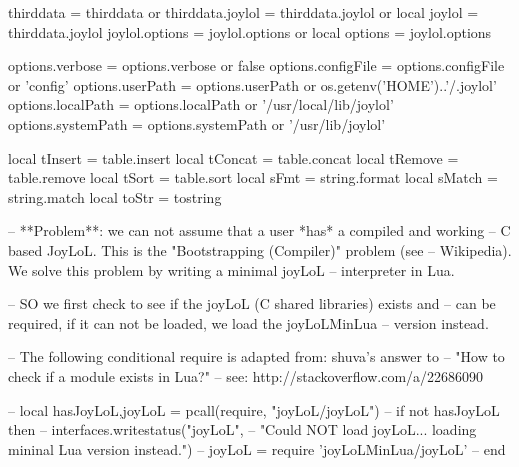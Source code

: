 thirddata          = thirddata        or {}
thirddata.joylol   = thirddata.joylol or {}
local joylol       = thirddata.joylol
joylol.options     = joylol.options or {}
local options      = joylol.options

options.verbose    =
  options.verbose    or false
options.configFile =
  options.configFile or 'config'
options.userPath   =
  options.userPath   or os.getenv('HOME')..'/.joylol'
options.localPath  =
  options.localPath  or '/usr/local/lib/joylol'
options.systemPath =
  options.systemPath or '/usr/lib/joylol'

local tInsert = table.insert
local tConcat = table.concat
local tRemove = table.remove
local tSort   = table.sort
local sFmt    = string.format
local sMatch  = string.match
local toStr   = tostring

-- **Problem**: we can not assume that a user *has* a compiled and working 
-- C based JoyLoL. This is the "Bootstrapping (Compiler)" problem (see 
-- Wikipedia). We solve this problem by writing a minimal joyLoL 
-- interpreter in Lua. 

-- SO we first check to see if the joyLoL (C shared libraries) exists and 
-- can be required, if it can not be loaded, we load the joyLoLMinLua 
-- version instead. 

-- The following conditional require is adapted from: shuva's answer to 
--  "How to check if a module exists in Lua?"
-- see: http://stackoverflow.com/a/22686090

-- local hasJoyLoL,joyLoL = pcall(require, "joyLoL/joyLoL")
-- if not hasJoyLoL then
-- interfaces.writestatus("joyLoL",
--     "Could NOT load joyLoL... loading mininal Lua version instead.")
--  joyLoL = require 'joyLoLMinLua/joyLoL'
-- end
\stopLuaCode